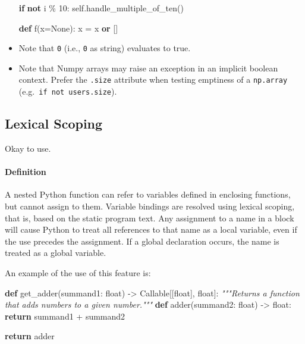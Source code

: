 \documentclass[
]{article}
\newenvironment{Shaded}{}{}
\newcommand{\BuiltInTok}[1]{\textcolor[rgb]{0.00,0.50,0.00}{#1}}
\newcommand{\CommentTok}[1]{\textcolor[rgb]{0.38,0.63,0.69}{\textit{#1}}}
\newcommand{\ControlFlowTok}[1]{\textcolor[rgb]{0.00,0.44,0.13}{\textbf{#1}}}
\newcommand{\DecValTok}[1]{\textcolor[rgb]{0.25,0.63,0.44}{#1}}
\newcommand{\KeywordTok}[1]{\textcolor[rgb]{0.00,0.44,0.13}{\textbf{#1}}}
\newcommand{\NormalTok}[1]{#1}
\newcommand{\OperatorTok}[1]{\textcolor[rgb]{0.40,0.40,0.40}{#1}}
\newcommand{\VariableTok}[1]{\textcolor[rgb]{0.10,0.09,0.49}{#1}}
\begin{document}
\begin{itemize}
\begin{samepage}
\begin{Shaded}
\begin{Highlighting}[]
     \ControlFlowTok{if} \KeywordTok{not}\NormalTok{ i }\OperatorTok{\%} \DecValTok{10}\NormalTok{:}
         \VariableTok{self}\NormalTok{.handle\_multiple\_of\_ten()}

     \KeywordTok{def}\NormalTok{ f(x}\OperatorTok{=}\VariableTok{None}\NormalTok{):}
\NormalTok{         x }\OperatorTok{=}\NormalTok{ x }\KeywordTok{or}\NormalTok{ []}
\end{Highlighting}
\end{Shaded}
\end{samepage}
\item
  Note that \texttt{\textquotesingle{}0\textquotesingle{}} (i.e.,
  \texttt{0} as string) evaluates to true.
\item
  Note that Numpy arrays may raise an exception in an implicit boolean
  context. Prefer the \texttt{.size} attribute when testing emptiness of
  a \texttt{np.array} (e.g.~\texttt{if\ not\ users.size}).
\end{itemize}

\subsection{Lexical Scoping}

Okay to use.

\paragraph{Definition}

A nested Python function can refer to variables defined in enclosing
functions, but cannot assign to them. Variable bindings are resolved
using lexical scoping, that is, based on the static program text. Any
assignment to a name in a block will cause Python to treat all
references to that name as a local variable, even if the use precedes
the assignment. If a global declaration occurs, the name is treated as a
global variable.

An example of the use of this feature is:

\begin{samepage}
\begin{Shaded}
\begin{Highlighting}[]
\KeywordTok{def}\NormalTok{ get\_adder(summand1: }\BuiltInTok{float}\NormalTok{) }\OperatorTok{{-}\textgreater{}}\NormalTok{ Callable[[}\BuiltInTok{float}\NormalTok{], }\BuiltInTok{float}\NormalTok{]:}
    \CommentTok{"""Returns a function that adds numbers to a given number."""}
    \KeywordTok{def}\NormalTok{ adder(summand2: }\BuiltInTok{float}\NormalTok{) }\OperatorTok{{-}\textgreater{}} \BuiltInTok{float}\NormalTok{:}
        \ControlFlowTok{return}\NormalTok{ summand1 }\OperatorTok{+}\NormalTok{ summand2}

    \ControlFlowTok{return}\NormalTok{ adder}
\end{Highlighting}
\end{Shaded}
\end{samepage}
\end{document}
